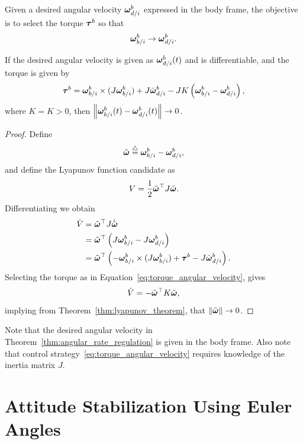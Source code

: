 Given a desired angular velocity $\boldsymbol{\omega}_{d/i}^b$ expressed in the body frame, the objective is to select the torque $\boldsymbol{\tau}^b$ so that 
\[
\boldsymbol{\omega}_{b/i}^b \to  \boldsymbol{\omega}_{d/i}^b.
\]
\begin{theorem}\label{thm:angular_rate_regulation}
If the desired angular velocity is given as 	$\boldsymbol{\omega}_{d/i}^b(t)$ and is differentiable, and the torque is given by
\begin{equation}\label{eq:torque_angular_velocity}
\taubf^b = \omegabf_{b/i}^b \times (J\omegabf_{b/i}^b) + J\dot{\omegabf}_{d/i}^b - JK\left(\omegabf_{b/i}^b-\omegabf_{d/i}^b\right),
\end{equation}
where $K=K>0$, then $\left\|\boldsymbol{\omega}_{b/i}^b(t) -  \boldsymbol{\omega}_{d/i}^b(t)\right\| \to 0$.
\end{theorem}
\begin{proof}
Define
\[
\tilde{\boldsymbol{\omega}}\stackrel{\triangle}{=} \boldsymbol{\omega}_{b/i}^b -  \boldsymbol{\omega}_{d/i}^b, 
\]
and define the Lyapunov function candidate as
\[
V = \frac{1}{2} \tilde{\boldsymbol{\omega}}^\top J \tilde{\boldsymbol{\omega}}.
\]
Differentiating we obtain
\begin{align*}
\dot{V} &= \tilde{\boldsymbol{\omega}}^\top J \dot{\tilde{\boldsymbol{\omega}}} \\
	&= \tilde{\boldsymbol{\omega}}^\top \left( J\boldsymbol{\omega}_{b/i}^b - J\boldsymbol{\omega}_{d/i}^b \right) \\
	&= \tilde{\boldsymbol{\omega}}^\top \left( -\boldsymbol{\omega}_{b/i}^b \times (J\boldsymbol{\omega}_{b/i}^b) + \boldsymbol{\tau}^b - J\dot{\boldsymbol{\omega}}_{d/i}^b \right).
\end{align*}
Selecting the torque as in Equation~\eqref{eq:torque_angular_velocity}, gives
\[
\dot{V} = -\tilde{\boldsymbol{\omega}}^\top K \tilde{\boldsymbol{\omega}},
\]
implying from Theorem~\ref{thm:lyapunov_theorem}, that $\left\|\tilde{\boldsymbol{\omega}}\right\|\to 0$.
\end{proof}

Note that the desired angular velocity in Theorem~\ref{thm:angular_rate_regulation} is given in the body frame.  
Also note that control strategy~\eqref{eq:torque_angular_velocity} requires knowledge of the inertia matrix $J$.  


\section{Attitude Stabilization Using Euler Angles}

